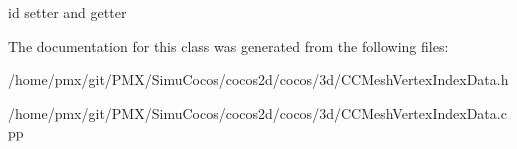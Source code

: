 id setter and getter 

The documentation for this class was generated from the following files\+:\begin{DoxyCompactItemize}
\item 
/home/pmx/git/\+P\+M\+X/\+Simu\+Cocos/cocos2d/cocos/3d/C\+C\+Mesh\+Vertex\+Index\+Data.\+h\item 
/home/pmx/git/\+P\+M\+X/\+Simu\+Cocos/cocos2d/cocos/3d/C\+C\+Mesh\+Vertex\+Index\+Data.\+cpp\end{DoxyCompactItemize}
